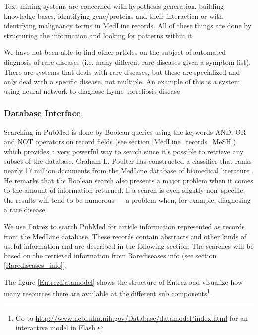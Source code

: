 Text mining systems are concerned with hypothesis generation, building
knowledge bases, identifying gene/proteins and their interaction or
with identifying malignancy terms in MedLine records. All of these
things are done by structuring the information and looking for
patterns within it.

We have not been able to find other articles on the subject of
automated diagnosis of rare diseases (i.e. many different rare
diseases given a symptom list). There are systems that deals with rare
diseases, but these are specialized and only deal with a specific
disease, not multiple. An example of this is a system using neural
network to diagnose Lyme borreliosis disease \cite{AutomatedNNLyme}

\subsubsection{Database Interface}
Searching in PubMed is done by Boolean queries using the keywords AND,
OR and NOT operators on record fields (see section
\ref{MedLine_records_MeSH}) which provides a very powerful way to
search since it's possible to retrieve any subset of the
database. Graham L. Poulter has constructed a classifier that ranks
nearly 17 million documents from the MedLine database of biomedical
literature \cite{RapidClassification}. He remarks that the Boolean
search also presents a major problem when it comes to the amount of
information returned. If a search is even slightly non--specific, the
results will tend to be numerous --- a problem when, for example,
diagnosing a rare disease.

We use Entrez to search PubMed for article information
represented as records from the MedLine database. These records
contain abstracts and other kinds of useful information and are
described in the following section. The searches will be based on the
retrieved information from Rarediseases.info
(see section \ref{Rarediseases_info}). 

The figure \ref{EntrezDatamodel} shows the structure of Entrez and
visualize how many resources there are available at the different
sub components\footnote{Go to
  \href{http://www.ncbi.nlm.nih.gov/Database/datamodel/index.html}{http://www.ncbi.nlm.nih.gov/Database/datamodel/index.html}
  for an interactive model in Flash.}.

